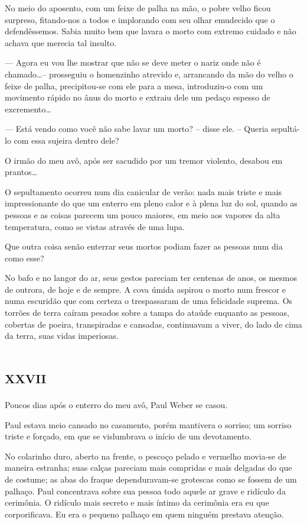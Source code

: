No meio do aposento, com um feixe de palha na mão, o pobre velho ficou surpreso, fitando-nos a todos e implorando com seu olhar emudecido que o defendêssemos. Sabia muito bem que lavara o morto com extremo cuidado e não achava que merecia tal insulto.

--- Agora eu vou lhe mostrar que não se deve meter o nariz onde não é chamado\dots -- prosseguiu o homenzinho atrevido e, arrancando da mão do velho o feixe de palha, precipitou-se com ele para a mesa, introduziu-o com um movimento rápido no ânus do morto e extraiu dele um pedaço espesso de excremento\dots

--- Está vendo como você não sabe lavar um morto? -- disse ele. -- Queria sepultá-lo com essa sujeira dentro dele?

O irmão do meu avô, após ser sacudido por um tremor violento, desabou em prantos\dots

O sepultamento ocorreu num dia canicular de verão: nada mais triste e mais impressionante do que um enterro em pleno calor e à plena luz do sol, quando as pessoas e as coisas parecem um pouco maiores, em meio aos vapores da alta temperatura, como se vistas através de uma lupa.

Que outra coisa senão enterrar seus mortos podiam fazer as pessoas num dia como esse?

No bafo e no langor do ar, seus gestos pareciam ter centenas de anos, os mesmos de outrora, de hoje e de sempre. A cova úmida aspirou o morto num frescor e numa escuridão que com certeza o trespassaram de uma felicidade suprema. Os torrões de terra caíram pesados sobre a tampa do ataúde enquanto as pessoas, cobertas de poeira, transpiradas e cansadas, continuavam a viver, do lado de cima da terra, suas vidas imperiosas. 


\chapter*{\huge\centering\textsc{xxvii}}

Poucos dias após o enterro do meu avô, Paul Weber se casou.

Paul estava meio cansado no casamento, porém mantivera o sorriso; um sorriso triste e forçado, em que se vislumbrava o início de um devotamento.

No colarinho duro, aberto na frente, o pescoço pelado e vermelho movia-se de maneira estranha; suas calças pareciam mais compridas e mais delgadas do que de costume; as abas do fraque dependuravam-se grotescas como se fossem de um palhaço. Paul concentrava sobre sua pessoa todo aquele ar grave e ridículo da cerimônia. O ridículo mais secreto e mais íntimo da cerimônia era eu que corporificava. Eu era o pequeno palhaço em quem ninguém prestava atenção.

